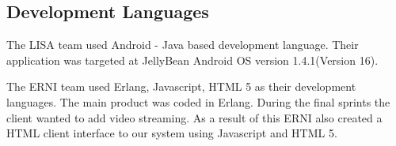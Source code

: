 \subsection{Development Languages}

The LISA team used Android - Java based development language. Their application was targeted at JellyBean Android OS version 1.4.1(Version 16).

The ERNI team used Erlang, Javascript, HTML 5  as their development languages. The main product was coded in Erlang. During the final sprints the client wanted to add video streaming. As a result of this ERNI also created a HTML client interface to our system using Javascript and HTML 5. 